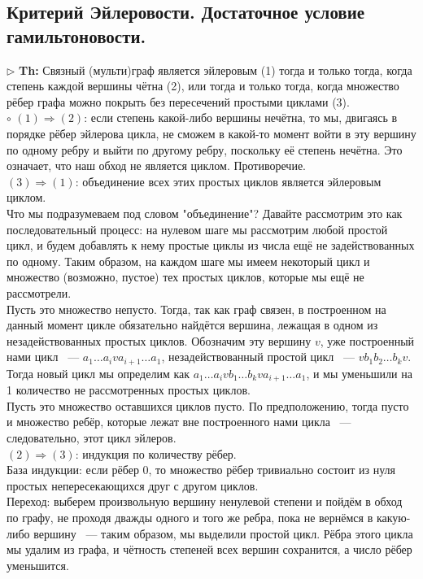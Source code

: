 \documentclass[a4paper]{article}
\begin{document}
\subsection{Критерий Эйлеровости. Достаточное условие гамильтоновости.}
$\triangleright$ \textbf{Th:}  Связный (мульти)граф является эйлеровым (1) тогда и только тогда, когда степень каждой вершины чётна (2), или тогда и только тогда, когда множество рёбер графа можно покрыть без пересечений простыми циклами (3).
\\
$\circ$  $(1)\Rightarrow(2)$: если степень какой-либо вершины нечётна, то мы, двигаясь в порядке рёбер эйлерова цикла, не сможем в какой-то момент войти в эту вершину по одному ребру и выйти по другому ребру, поскольку её степень нечётна. Это означает, что наш обход не является циклом. Противоречие.\\
$(3)\Rightarrow(1)$: объединение всех этих простых циклов является эйлеровым циклом.\\
Что мы подразумеваем под словом "объединение"? Давайте рассмотрим это как последовательный процесс: на нулевом шаге мы рассмотрим любой простой цикл, и будем добавлять к нему простые циклы из числа ещё не задействованных по одному. Таким образом, на каждом шаге мы имеем некоторый цикл и множество (возможно, пустое) тех простых циклов, которые мы ещё не рассмотрели.\\
Пусть это множество непусто. Тогда, так как граф связен, в построенном на данный момент цикле обязательно найдётся вершина, лежащая в одном из незадействованных простых циклов. Обозначим эту вершину $v$, уже построенный нами цикл ~--- $a_1\dots a_i v a_{i+1}\dots a_1$, незадействованный простой цикл ~--- $vb_1b_2\dots b_kv$. Тогда новый цикл мы определим как $a_1\dots a_i v b_1\dots b_k v a_{i+1}\dots a_1$, и мы уменьшили на 1 количество не рассмотренных простых циклов.\\
Пусть это множество оставшихся циклов пусто. По предположению, тогда пусто и множество ребёр, которые лежат вне построенного нами цикла ~--- следовательно, этот цикл эйлеров.\\
$(2)\Rightarrow(3)$: индукция по количеству рёбер.\\
База индукции: если рёбер $0$, то множество рёбер тривиально состоит из нуля простых непересекающихся друг с другом циклов.\\
Переход: выберем произвольную вершину ненулевой степени и пойдём в обход по графу, не проходя дважды одного и того же ребра, пока не вернёмся в какую-либо вершину ~--- таким образом, мы выделили простой цикл. Рёбра этого цикла мы удалим из графа, и чётность степеней всех вершин сохранится, а число рёбер уменьшится.
\end{document}

